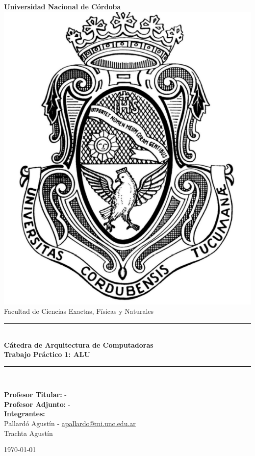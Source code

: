 \begin{titlepage}
    \begin{center}
        {\LARGE \textbf{Universidad Nacional de Córdoba}}\\[1.5cm]

        \includegraphics[scale=0.4]{img/logo2.png}\\[1.5cm]

        {\large Facultad de Ciencias Exactas, Físicas y Naturales}\\

        \rule{\linewidth}{0.5mm}\\[0.4cm]
        {\Large \textbf{Cátedra de Arquitectura de Computadoras}}\\[0.3cm]
        {\LARGE \textbf{Trabajo Práctico 1: ALU}}\\[0.3cm]
        \rule{\linewidth}{0.5mm}\\[1cm]

        \begin{flushleft}
        {\large 
            \textbf{Profesor Titular:} -\\
            \textbf{Profesor Adjunto:} -\\[0.5cm]
            \textbf{Integrantes:}\\
            Pallardó Agustín - 
            \href{mailto:apallardo@mi.unc.edu.ar}{apallardo@mi.unc.edu.ar}\\
            Trachta Agustín\\
        }
        \end{flushleft}

        \vfill

        {\large \today}
    \end{center}
\end{titlepage}